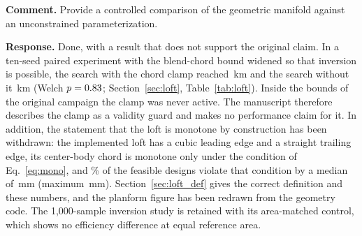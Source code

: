 \documentclass[11pt]{article}
\newcommand{\cmt}[1]{\par\medskip\noindent\textbf{Comment.} #1}
\newcommand{\rsp}[1]{\par\noindent\textbf{Response.} #1}
\begin{document}
\cmt{Provide a controlled comparison of the geometric manifold against an unconstrained parameterization.}
\rsp{Done, with a result that does not support the original claim. In a ten-seed paired experiment with the blend-chord bound widened so that inversion is possible, the search with the chord clamp reached \NclampMean\,km and the search without it \NnoclampMean\,km (Welch $p = 0.83$; Section~\ref{sec:loft}, Table~\ref{tab:loft}). Inside the bounds of the original campaign the clamp was never active. The manuscript therefore describes the clamp as a validity guard and makes no performance claim for it. In addition, the statement that the loft is monotone by construction has been withdrawn: the implemented loft has a cubic leading edge and a straight trailing edge, its center-body chord is monotone only under the condition of Eq.~\eqref{eq:mono}, and \NvMonoViolShare\% of the feasible designs violate that condition by a median of \NvMonoMedian\,mm (maximum \NvMonoMax\,mm). Section~\ref{sec:loft_def} gives the correct definition and these numbers, and the planform figure has been redrawn from the geometry code. The 1,000-sample inversion study is retained with its area-matched control, which shows no efficiency difference at equal reference area.}
\end{document}
